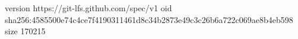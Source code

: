 version https://git-lfs.github.com/spec/v1
oid sha256:4585500e74c4ce7f4190311461d8c34b2873e49c3c26b6a722c069ae8b4eb598
size 170215
